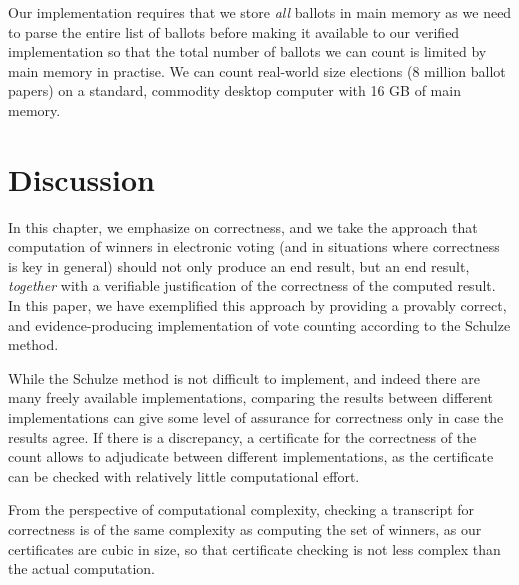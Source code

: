Our implementation requires that we store \emph{all}
ballots in main memory as we need to parse the entire list of
ballots before making it available to our verified implementation so
that the total number of ballots we can count is limited by main
memory in practise. We can count real-world size elections (8
million ballot papers) on a standard, commodity desktop computer with
16 GB of main memory. 

  
\section{Discussion} \label{sec:discussion}

In this chapter,  we emphasize on correctness, 
and we take the approach that 
computation of winners in
electronic voting (and in situations where correctness is key in
general) should not only produce an end result, but an end result,
\emph{together} with a verifiable justification of the correctness
of the computed result. In this paper, we have exemplified this
approach by providing a provably correct, and evidence-producing
implementation of vote counting according to the Schulze method. 

While the Schulze method is not difficult to implement, and indeed
there are many freely available implementations, comparing the
results between different implementations can give some level of
assurance for correctness only in case the results agree.  If there
is a discrepancy, a certificate for the correctness of the count
allows to adjudicate between different implementations, as the
certificate can be checked with relatively little computational
effort. 

From the perspective of computational complexity, checking a
transcript for correctness is of the same complexity as computing
the set of winners, as our certificates are cubic in size, so that
certificate checking is not less complex than the actual
computation. 

